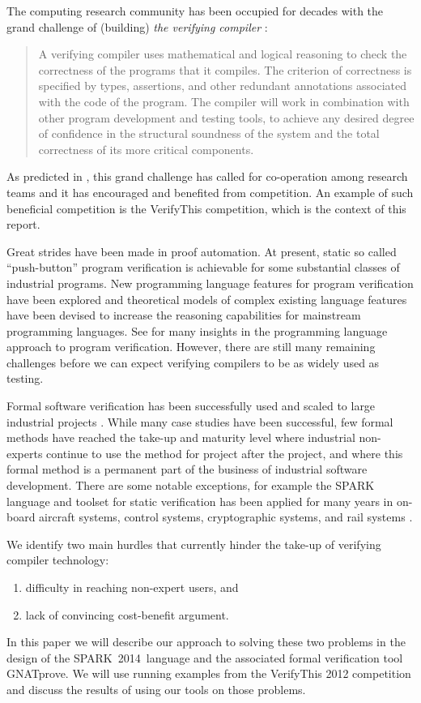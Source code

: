 \documentclass[sttt,final]{svjour}
\newcommand{\gnatprove}{GNATprove\xspace}
\newcommand{\newspark}{SPARK~2014\xspace}
\begin{document}
The computing research community has been occupied for decades with
the grand challenge of (building) \emph{the verifying compiler}
\cite{Hoare03theverifying}:
%
\begin{quote} A verifying compiler uses mathematical and logical reasoning
  to check the correctness of the programs that it compiles. The
  criterion of correctness is specified by types, assertions, and
  other redundant annotations associated with the code of the
  program. The compiler will work in combination with other program
  development and testing tools, to achieve any desired degree of
  confidence in the structural soundness of the system and the total
  correctness of its more critical components.
\end{quote}

As predicted in \cite{Hoare03theverifying}, this grand challenge has
called for co-operation among research teams and it has encouraged
and benefited from competition. An example of such beneficial
competition is the VerifyThis competition, which is the context of
this report.

Great strides have been made in proof automation. At present, static
so called ``push-button'' program verification is achievable for some
substantial classes of industrial programs. New programming language
features for program verification have been explored and theoretical
models of complex existing language features have been devised to
increase the reasoning capabilities for mainstream programming
languages. See \cite{HatcliffLLMP12} for many insights in the
programming language approach to program verification. However, there
are still many remaining challenges before we can expect verifying
compilers to be as widely used as testing.

Formal software verification has been successfully used and scaled to
large industrial projects \cite{Woodcock2009,vcc2009}. While many case
studies have been successful, few formal methods have reached the
take-up and maturity level where industrial non-experts continue to
use the method for project after the project, and where this formal
method is a permanent part of the business of industrial software
development. There are some notable exceptions, for example the SPARK
language and toolset for static verification has been applied for many
years in on-board aircraft systems, control systems, cryptographic
systems, and rail systems \cite{sparkbook2012,oneill2012}.

We identify two main hurdles that currently hinder the
take-up of verifying compiler technology:
%
\begin{enumerate}
\item difficulty in reaching non-expert users, and
\item lack of convincing cost-benefit argument.
\end{enumerate}
%
In this paper we will describe our approach to solving these two
problems in the design of the \newspark\ language and the associated
formal verification tool \gnatprove. We will use running examples from
the VerifyThis 2012 competition and discuss the results of using our
tools on those problems.
\end{document}
